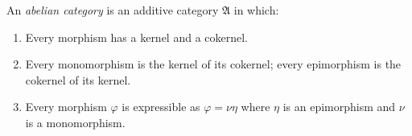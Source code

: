 An \textit{abelian category} is an additive category $\mathfrak{A}$ in which:
\begin{enumerate}
\item[(i)] Every morphism has a kernel and a cokernel.
\item[(ii)] Every monomorphism is the kernel of its cokernel; every epimorphism is the cokernel of its kernel.
\item[(iii)] Every morphism $\varphi$ is expressible as $\varphi = \nu \eta$ where $\eta$ is an epimorphism and $\nu$ is a monomorphism.
\end{enumerate}
